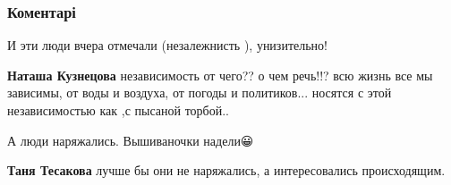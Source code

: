  
 
 
 
 
\subsubsection{Коментарі}
\label{sec:25_08_2021.fb.egorova_snezhana.1.itogi_nezavisimosti.cmt}

\begin{itemize}
 
И эти люди вчера отмечали (незалежнисть ), унизительно!

\begin{itemize}
 
\textbf{Наташа Кузнецова} независимость от чего?? о чем речь!!? всю жизнь все мы
зависимы, от воды и воздуха, от погоды и политиков... носятся с этой
независимостью как ,с пысаной торбой..
\end{itemize}

 
А люди наряжались. Вышиваночки надели😀

\begin{itemize}
 
\textbf{Таня Тесакова} лучше бы они не наряжались, а интересовались происходящим.


\end{itemize}
\end{itemize}
